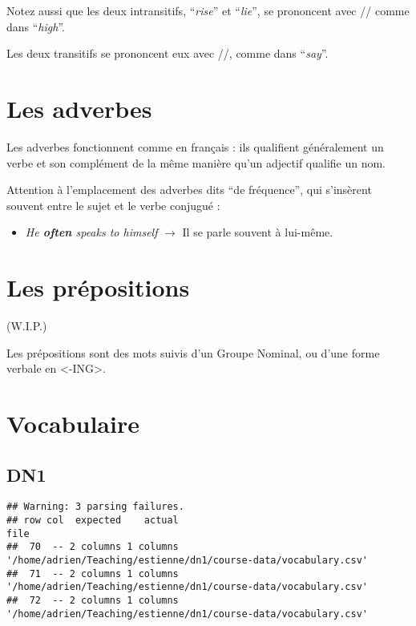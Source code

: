 \documentclass[
  10pt,
]{article}
\providecommand{\tightlist}{%
  \setlength{\itemsep}{0pt}\setlength{\parskip}{0pt}}
\begin{document}
Notez aussi que les deux intransitifs, ``\emph{rise}'' et ``\emph{lie}'', se prononcent avec // comme
dans ``\emph{high}''.

Les deux transitifs se prononcent eux avec //, comme dans ``\emph{say}''.

\hypertarget{les-adverbes}{%
\section{Les adverbes}\label{les-adverbes}}

Les adverbes fonctionnent comme en français : ils qualifient généralement un verbe et son complément de la même manière qu'un adjectif qualifie un nom.

Attention à l'emplacement des adverbes dits ``de fréquence'', qui s'insèrent souvent entre le sujet et le verbe conjugué :

\begin{itemize}
\tightlist
\item
  \emph{He \textbf{often} speaks to himself} \(\rightarrow\) Il se parle souvent à lui-même.
\end{itemize}

\hypertarget{les-pruxe9positions}{%
\section{Les prépositions}\label{les-pruxe9positions}}

(W.I.P.)

Les prépositions sont des mots suivis d'un Groupe Nominal, ou d'une forme verbale en \textless-ING\textgreater.

\hypertarget{vocabulaire}{%
\section{Vocabulaire}\label{vocabulaire}}

\hypertarget{dn1}{%
\subsection{DN1}\label{dn1}}

\begin{verbatim}
## Warning: 3 parsing failures.
## row col  expected    actual                                                            file
##  70  -- 2 columns 1 columns '/home/adrien/Teaching/estienne/dn1/course-data/vocabulary.csv'
##  71  -- 2 columns 1 columns '/home/adrien/Teaching/estienne/dn1/course-data/vocabulary.csv'
##  72  -- 2 columns 1 columns '/home/adrien/Teaching/estienne/dn1/course-data/vocabulary.csv'
\end{verbatim}
\end{document}
